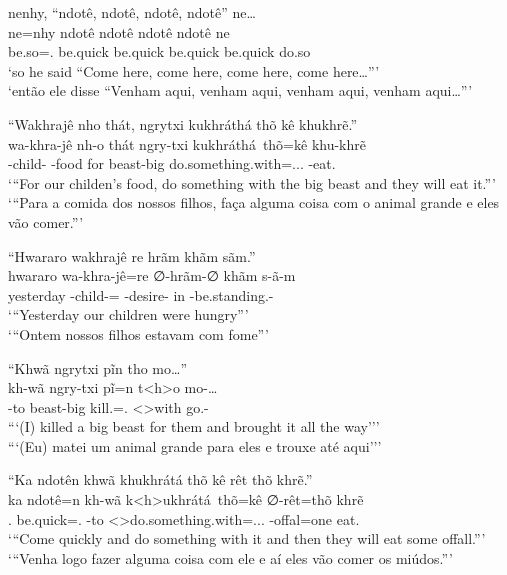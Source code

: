 \documentclass[output=paper,
modfonts,nonflat
]{langsci/langscibook}
\begin{document}
\ea  nenhy,  ``ndotê, ndotê, ndotê, ndotê'' ne\ldots{} \\[.3em]
\gll ne=nhy           ndotê    ndotê    ndotê    ndotê    ne    \\
     be.so=\AAnd.\Ds{} be.quick be.quick be.quick be.quick do.so \\
\glt `so he said ``Come here, come here, come here, come here\ldots''{}' \\
     `então ele disse ``Venham aqui, venham aqui, venham aqui, venham aqui\ldots''{}' \\
\z

\ea  ``Wakhrajê nho thát, ngrytxi kukhráthá thõ kê khukhrẽ.'' \\[.3em]
\gll wa-khra-jê              nh-o    thát ngry-txi  kukhráthá\ thõ=kê                        khu-khrẽ         \\
     \First\Incl-child-\Pl{} \E-food for  beast-big do.something.with=\AAnd.\Ds.\Third.\Fut{} \Third-eat.\Pl{} \\
\glt `{}``For our childen's food, do something with the big beast and they will eat it.''{}' \\
     `{}``Para a comida dos nossos filhos, faça alguma coisa com o animal grande e eles vão comer.''{}' \\
\z

\ea  ``Hwararo wakhrajê re hrãm khãm sãm.'' \\[.3em]
\gll hwararo   wa-khra-jê=re                  ∅-hrãm-∅              khãm s-ã-m                          \\
     yesterday \First\Incl-child-\Pl{}=\Erg{} \Third-desire-\Nmlz{} in   \Third-be.standing.\Sg-\Nmlz{} \\
\glt `{}``Yesterday our children were hungry''{}' \\
     `{}``Ontem nossos filhos estavam com fome''{}' \\
\z

\ea  ``Khwã ngrytxi pĩn tho mo\ldots{}'' \\[.3em]
\gll kh-wã     ngry-txi  pĩ=n                t<h>o        mo-\ldots{}       \\
     \Third-to beast-big kill.\Sg=\AAnd.\Ss{} <\Third>with go.\Pl{}-\Ints{} \\
\glt ``{}`(I) killed a big beast for them and brought it all the way''{}' \\
     ``{}`(Eu) matei um animal grande para eles e trouxe até aqui''{}' \\
\z

\ea  ``Ka ndotên khwã khukhrátá thõ kê rêt thõ khrẽ.'' \\[.3em]
\gll ka             ndotê=n             kh-wã     k<h>ukhrátá\ thõ=kê                              ∅-rêt=thõ        khrẽ      \\
     \Second.\Nom{} be.quick=\AAnd.\Ss{} \Third-to <\Third>do.something.with=\AAnd.\Ds.\Third.\Fut{} \Third-offal=one eat.\Pl{} \\
\glt `{}``Come quickly and do something with it and then they will eat some offall.''{}' \\
     `{}``Venha logo fazer alguma coisa com ele e aí eles vão comer os miúdos.''{}' \\
\z
\end{document}
